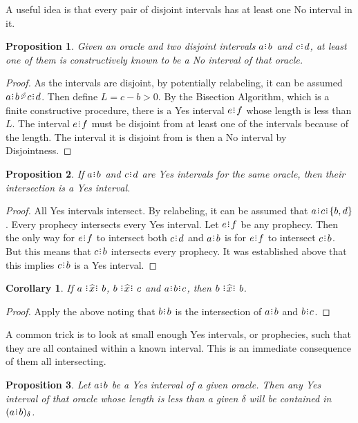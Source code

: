 \documentclass[12pt]{article}
\newtheorem{corollary}{Corollary}[section]
\newtheorem{proposition}{Proposition}[section]
\begin{document}
A useful idea is that every pair of disjoint intervals has at least one No interval in it. 

\begin{proposition}
    Given an oracle and two disjoint intervals $a\rint b$ and $c\rint d$, at least one of them is constructively known to be a No interval of that oracle. 
\end{proposition}

\begin{proof}
    As the intervals are disjoint, by potentially relabeling, it can be assumed $a\rint b \lt c\rint d$. Then define $L = c-b > 0$. By the Bisection Algorithm, which is a finite constructive procedure, there is a Yes interval $e\rint f$ whose length is less than $L$. The interval $e\rint f$ must be disjoint from at least one of the intervals because of the length. The interval it is disjoint from is then a No interval by Disjointness. 
\end{proof}

   
\begin{proposition}
    If $ a\rint b$ and $c\rint d$ are Yes intervals for the same oracle, then their intersection is a Yes interval. 
\end{proposition}

\begin{proof}
    All Yes intervals intersect. By relabeling, it can be assumed that $a \rint c \rint \{b, d\}$. Every prophecy intersects every Yes interval. Let $e\rint f$ be any prophecy. Then the only way for $e\rint f$ to intersect both $c\rint d$ and $a\rint b$ is for $e\rint f$ to intersect $c\rint b$.  But this means that $c\rint b$ intersects every prophecy. It was established above that this implies $c\rint b$ is a Yes interval. 
\end{proof}

\begin{corollary}
    If $a \xora b$, $b \xora c$ and $a\rint b\rint c$, then $b \xora b$.
\end{corollary}

\begin{proof}
    Apply the above noting that $b\rint b$ is the intersection of $a\rint b$ and $b\rint c$.
\end{proof}

A common trick is to look at small enough Yes intervals, or prophecies, such that they are all contained within a known interval. This is an immediate consequence of them all intersecting. 

\begin{proposition}\label{os-yescontain}
    Let $a\rint b$ be a Yes interval of a given oracle. Then any Yes interval of that oracle whose length is less than a given $\delta$ will be contained in $\halo{a\rint b}$.
\end{proposition}
\end{document}
